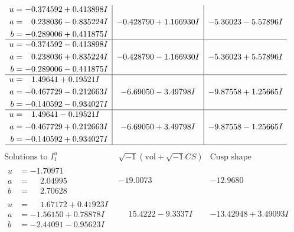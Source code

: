 \documentclass[1p]{elsarticle_modified}
\theoremstyle{definition}
\newcommand{\I}{\sqrt{-1}}
\begin{document}
$$\begin{array}{c|c|c}
\begin{aligned}
u &= -0.374592 + 0.413898 I \\
a &= \phantom{-}0.238036 - 0.835224 I \\
b &= -0.289006 + 0.411875 I\end{aligned}
 & -0.428790 + 1.166930 I & -5.36023 - 5.57896 I \\ \hline\begin{aligned}
u &= -0.374592 - 0.413898 I \\
a &= \phantom{-}0.238036 + 0.835224 I \\
b &= -0.289006 - 0.411875 I\end{aligned}
 & -0.428790 - 1.166930 I & -5.36023 + 5.57896 I \\ \hline\begin{aligned}
u &= \phantom{-}1.49641 + 0.19521 I \\
a &= -0.467729 - 0.212663 I \\
b &= -0.140592 - 0.934027 I\end{aligned}
 & -6.69050 - 3.49798 I & -9.87558 + 1.25665 I \\ \hline\begin{aligned}
u &= \phantom{-}1.49641 - 0.19521 I \\
a &= -0.467729 + 0.212663 I \\
b &= -0.140592 + 0.934027 I\end{aligned}
 & -6.69050 + 3.49798 I & -9.87558 - 1.25665 I\\
 \hline 
 \end{array}$$\newpage$$\begin{array}{c|c|c}  
\text{Solutions to }I^u_{1}& \I (\text{vol} + \sqrt{-1}CS) & \text{Cusp shape}\\
 \hline 
\begin{aligned}
u &= -1.70971\phantom{ +0.000000I} \\
a &= \phantom{-}2.04995\phantom{ +0.000000I} \\
b &= \phantom{-}2.70628\phantom{ +0.000000I}\end{aligned}
 & -19.0073\phantom{ +0.000000I} & -12.9680\phantom{ +0.000000I} \\ \hline\begin{aligned}
u &= \phantom{-}1.67172 + 0.41923 I \\
a &= -1.56150 + 0.78878 I \\
b &= -2.44091 - 0.95623 I\end{aligned}
 & \phantom{-}15.4222 - 9.3337 I & -13.42948 + 3.49093 I \\ \hline\begin{aligned}

\end{aligned}
\end{array}$$
\end{document}
